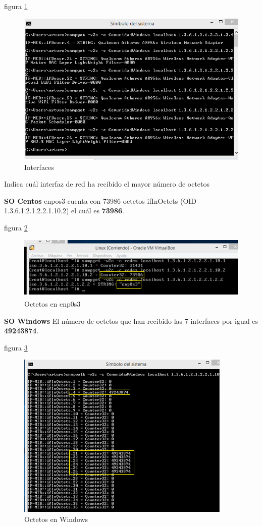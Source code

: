 figura  \ref{image:Pregunta4W2}
\FloatBarrier
\begin{figure}[htbp!]
		\centering
		    \includegraphics[width=.7 \textwidth]{../images/Pregunta4W2.png} 
		\caption{Interfaces}
		\label{image:Pregunta4W2}
\end{figure}
\FloatBarrier

\item Indica cuál interfaz de red ha recibido el mayor número de octetos

\textbf{SO Centos}
enpos3 cuenta con 73986 octetos ifInOctets (OID 1.3.6.1.2.1.2.2.1.10.2) el cuál es \textbf{73986}.

figura \ref{image:Pregunta5C}
 \FloatBarrier
\begin{figure}[htbp!]
		\centering
		    \includegraphics[width=.9 \textwidth]{../images/Pregunta5C.png} 
		\caption{Octetos en enp0s3}
		\label{image:Pregunta5C}
\end{figure}
\FloatBarrier

\textbf{SO Windows}
El número de octetos que han recibido las 7 interfaces por igual es \textbf{49243874}.

figura  \ref{image:Pregunta5W}
 \FloatBarrier
\begin{figure}[htbp!]
		\centering
		    \includegraphics[width=.7 \textwidth]{../images/Pregunta5W.png} 
		\caption{Octetos en Windows}
		\label{image:Pregunta5W}
\end{figure}
\FloatBarrier

